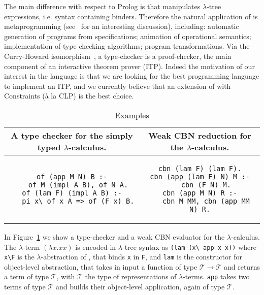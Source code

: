 \documentclass{llncs}
\begin{document}
The main difference with respect to Prolog is that \lp{} manipulates $\lambda$-tree expressions, i.e. syntax containing binders. Therefore the natural application of \lp{} is metaprogramming (see~\cite{thefrenchguy} for an interesting discussion), including: automatic generation of programs from specifications; animation of operational semantics; implementation of type checking algorithms; program transformations. Via the Curry-Howard isomorphism~\cite{curryhoward}, a type-checker is a proof-checker, the main component of an interactive theorem prover (ITP). Indeed the motivation of our interest in the language is that we are looking for the best programming language to implement an ITP, and we currently believe that an extension of \lp{} with Constraints (\`a la CLP) is the best choice.

\begin{table}
\begin{center}
\begin{tabular}{c@{~~}|@{~~}c}
A type checker for the simply typed $\lambda$-calculus. &
Weak CBN reduction for the $\lambda$-calculus.\\\hline
\begin{minipage}{5.0cm}
\begin{verbatim}
of (app M N) B :-
   of M (impl A B), of N A.
of (lam F) (impl A B) :-
   pi x\ of x A => of (F x) B.

\end{verbatim}
\end{minipage}
&
\begin{minipage}{5.0cm}
\begin{verbatim}
cbn (lam F) (lam F).
cbn (app (lam F) N) M :-
   cbn (F N) M.
cbn (app M N) R :-
   cbn M MM, cbn (app MM N) R.
\end{verbatim}
\end{minipage}
\end{tabular}
\end{center}
\caption{\label{example1} Examples}
\end{table}
In Figure~\ref{example1} we show a type-checker and a weak CBN evaluator for the
$\lambda$-calculus. The $\lambda$-term $(\lambda x.xx)$ is encoded in
$\lambda$-tree syntax as \verb+(lam (x\ app x x))+ where \verb+x\F+ is
the $\lambda$-abstraction of \lp{}, that binds \verb+x+ in \verb+F+, and
\verb+lam+ is the constructor for object-level abstraction, that takes in
input a function of type $\mathcal{T} \to \mathcal{T}$ and returns a term
of type $\mathcal{T}$, with $\mathcal{T}$ the type of representations of
$\lambda$-terms. \verb+app+ takes two terms of type $\mathcal{T}$ and builds
their object-level application, again of type $\mathcal{T}$.
\end{document}
